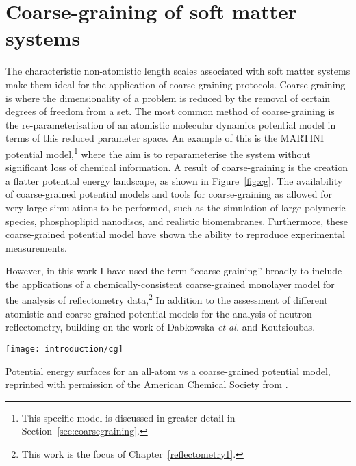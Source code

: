 \section{Coarse-graining of soft matter systems}
The characteristic non-atomistic length scales associated with soft matter systems make them ideal for the application of coarse-graining protocols.
Coarse-graining is where the dimensionality of a problem is reduced by the removal of certain degrees of freedom from a set.
The most common method of coarse-graining is the re-parameterisation of an atomistic molecular dynamics potential model in terms of this reduced parameter space.
An example of this is the MARTINI potential model,\footnote{This specific model is discussed in greater detail in Section~\ref{sec:coarsegraining}.} where the aim is to reparameterise the system without significant loss of chemical information.\autocite{marrink_martini_2007}
A result of coarse-graining is the creation a flatter potential energy landscape, as shown in Figure~\ref{fig:cg}.
The availability of coarse-grained potential models and tools for coarse-graining as allowed for very large simulations to be performed, such as the simulation of large polymeric species,\autocite{carbone_transferability_2008} phosphoplipid nanodiscs,\autocite{xue_molecular_2018} and realistic biomembranes.\autocite{marrink_computational_2019}
Furthermore, these coarse-grained potential model have shown the ability to reproduce experimental measurements.\autocite{negro_experimental_2014,nawaz_interactions_2012}

However, in this work I have used the term ``coarse-graining'' broadly to include the applications of a chemically-consistent coarse-grained monolayer model for the analysis of reflectometry data,\footnote{This work is the focus of Chapter~\ref{reflectometry1}.}
In addition to the assessment of different atomistic and coarse-grained potential models for the analysis of neutron reflectometry, building on the work of Dabkowska \emph{et al.} and Koutsioubas.\autocite[][see Chapter~\ref{reflectometry2}]{dabkowska_modulation_2014,koutsioubas_combined_2016}
%
\begin{marginfigure}
    \texttt{[image: introduction/cg]}
    \caption{Potential energy surfaces for an all-atom vs a coarse-grained potential model, reprinted with permission of the American Chemical Society from \cite{kmiecik_coarse-grained_2016}.}
    \label{fig:cg}
\end{marginfigure}
%
